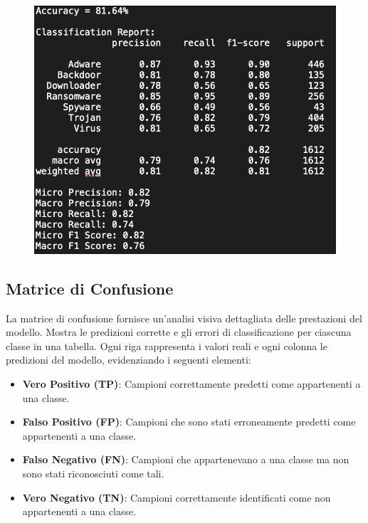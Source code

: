 \begin{figure}[ht]
    \centering
        \centering
        \includegraphics[width=0.8\linewidth]{images/evaluation.png}
        \label{fig:cnn_architecture}
\end{figure}

\subsection{Matrice di Confusione}
La matrice di confusione fornisce un'analisi visiva dettagliata delle prestazioni del modello. Mostra le predizioni corrette e gli errori di classificazione per ciascuna classe in una tabella. Ogni riga rappresenta i valori reali e ogni colonna le predizioni del modello, evidenziando i seguenti elementi:
\begin{itemize}
    \item \textbf{Vero Positivo (TP)}: Campioni correttamente predetti come appartenenti a una classe.
    \item \textbf{Falso Positivo (FP)}: Campioni che sono stati erroneamente predetti come appartenenti a una classe.
    \item \textbf{Falso Negativo (FN)}: Campioni che appartenevano a una classe ma non sono stati riconosciuti come tali.
    \item \textbf{Vero Negativo (TN)}: Campioni correttamente identificati come non appartenenti a una classe.
\end{itemize}

